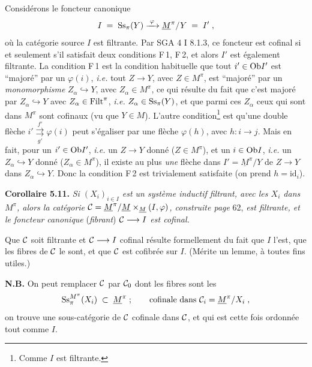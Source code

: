 Considérons le foncteur canonique
\[
I \;=\; \mathrm{Ss}_\pi(Y) \xrightarrow{\;\varphi\;} \underline{M}^\pi/Y \;=\; I' \;,
\]
où la catégorie source $I$ est filtrante. Par SGA 4 I 8.1.3, ce foncteur est cofinal si et seulement s'il satisfait deux conditions F\,1, F\,2, et alors $I'$ est également filtrante. La condition F\,1 est la condition habituelle que tout $i' \in \mathrm{Ob} I'$ est “majoré” par un $\varphi(i)$, \textit{i.e.} tout $Z \longrightarrow Y$, avec $Z \in M^\pi$, est “majoré” par un \textit{monomorphisme} $Z_\alpha \hookrightarrow Y$, avec $Z_\alpha \in M^\pi$, ce qui résulte du fait que c'est majoré par $Z_\alpha \hookrightarrow Y$ avec $Z_\alpha \in \mathrm{Filt}^\pi$, \textit{i.e.} $Z_\alpha \in \mathrm{Ss}_\pi(Y)$, et que parmi ces $Z_\alpha$ ceux qui sont dans $M^\pi$ sont cofinaux (vu que $Y \in M$). L'autre condition\footnote[23]{Comme $I$ est filtrante.} est qu'une double flèche $i' \overset{f'}{\underset{g'}{\rightrightarrows}} \varphi(i)$ peut
s'égaliser par une flèche $\varphi(h)$, avec $h : i \longrightarrow j$. Mais en fait, pour un $i' \in \mathrm{Ob} I'$, \textit{i.e.} un $Z \longrightarrow Y$ donné ($Z \in M^\pi$), et un $i \in \mathrm{Ob} I$, \textit{i.e.} un $Z_\alpha \hookrightarrow Y$ donné ($Z_\alpha \in M^\pi$), il existe au plus \textit{une} flèche dans $I' = \underline{M}^\pi/Y$ de $Z \longrightarrow Y$ dans $Z_\alpha \hookrightarrow Y$. Donc la condition F\,2 est trivialement satisfaite (on prend $h = \mathrm{id}_i$).

\textbf{Corollaire 5.11.} \textit{Si $(X_i)_{i \in I}$ est un système inductif filtrant, avec les $X_i$ dans $M^\pi$, alors la catégorie $\mathcal{C} = \underline{M}^\pi/\underline{M} \times_{\underline{M}} (I,\varphi)$, construite page} 62, \textit{est filtrante, et le foncteur canonique} (\textit{fibrant}) \textit{$\mathcal{C} \longrightarrow I$ est cofinal.}

Que $\mathcal{C}$ soit filtrante et $\mathcal{C} \longrightarrow I$ cofinal résulte formellement du fait que $I$ l'est, que les fibres de $\mathcal{C}$ le sont, et que $\mathcal{C}$ est cofibrée sur $I$. (Mérite un lemme, à toutes fins utiles.)

\textbf{N.B.} On peut remplacer $\mathcal{C}$ par $\mathcal{C}_0$ dont les fibres sont les
\[
\mathrm{Ss}_\pi^{M^\pi}(X_i) \;\subset\; \underline{M}^\pi \;; \qquad \text{cofinale dans } \mathcal{C}_i = \underline{M}^\pi/X_i \;,
\]
on trouve une sous-catégorie de $\mathcal{C}$ cofinale dans $\mathcal{C}$, et qui est cette fois ordonnée tout comme $I$.

